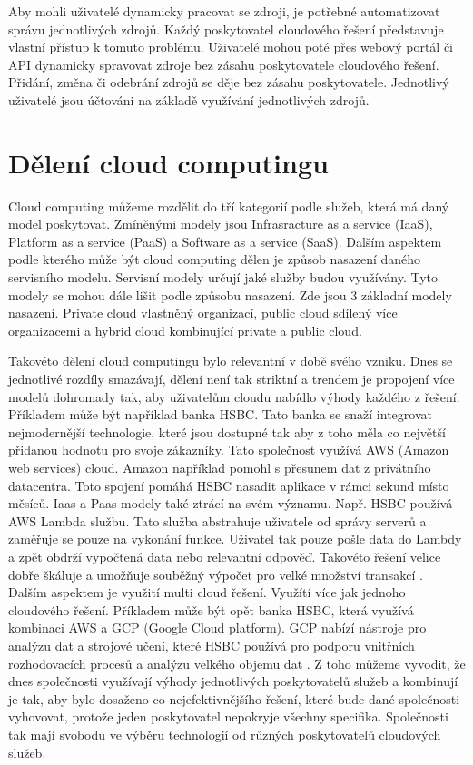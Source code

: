     Aby mohli uživatelé dynamicky pracovat se zdroji, je potřebné automatizovat správu jednotlivých zdrojů. Každý poskytovatel cloudového řešení představuje vlastní přístup k tomuto problému. Uživatelé mohou poté přes webový portál či API dynamicky spravovat zdroje bez zásahu poskytovatele cloudového řešení. Přidání, změna či odebrání zdrojů se děje bez zásahu poskytovatele. Jednotlivý uživatelé jsou účtováni na základě využívání jednotlivých zdrojů. 

\section{Dělení cloud computingu}
    Cloud computing můžeme rozdělit do tří kategorií podle služeb, která má daný model poskytovat. Zmíněnými modely jsou Infrasracture as a service (IaaS), Platform as a service (PaaS) a Software as a service (SaaS). Dalším aspektem podle kterého může být cloud computing dělen je způsob nasazení daného servisního modelu. Servisní modely určují jaké služby budou využívány. Tyto modely se mohou dále lišit podle způsobu nasazení. Zde jsou 3 základní modely nasazení. Private cloud vlastněný organizací, public cloud sdílený více organizacemi a hybrid cloud kombinující private a public cloud. \par
        Takovéto dělení cloud computingu bylo relevantní v době svého vzniku. Dnes se jednotlivé rozdíly smazávají, dělení není tak striktní a trendem je propojení více modelů dohromady tak, aby uživatelům cloudu nabídlo výhody každého z řešení. Příkladem může být například banka HSBC. Tato banka se snaží integrovat nejmodernější technologie, které jsou dostupné tak aby z toho měla co největší přidanou hodnotu \linebreak pro svoje zákazníky. Tato společnost využívá AWS (Amazon web services) cloud. Amazon například pomohl s přesunem dat z privátního datacentra. Toto spojení pomáhá HSBC nasadit aplikace v rámci sekund místo měsíců. Iaas a Paas modely také ztrácí na svém významu. Např. HSBC používá AWS Lambda službu. Tato služba abstrahuje uživatele od správy serverů a zaměřuje se pouze na vykonání funkce. Uživatel tak pouze pošle data do Lambdy a zpět obdrží vypočtená data nebo relevantní odpověď. Takovéto řešení velice dobře škáluje a umožňuje souběžný výpočet pro velké množství transakcí \cite{devopsonline}. Dalším aspektem je využití multi cloud řešení. Využítí více jak jednoho cloudového řešení. Příkladem může být opět banka HSBC, která využívá kombinaci AWS a GCP (Google Cloud platform). GCP nabízí nástroje pro analýzu dat a strojové učení, které HSBC používá pro podporu vnitřních rozhodovacích procesů a analýzu velkého objemu dat \cite{digitalnewasia}. Z toho můžeme vyvodit, že dnes společnosti využívají výhody jednotlivých poskytovatelů služeb a kombinují je tak, aby bylo dosaženo co nejefektivnějšího řešení, které bude dané společnosti vyhovovat, protože jeden poskytovatel nepokryje všechny specifika. Společnosti tak mají svobodu ve výběru technologií od různých poskytovatelů cloudových služeb.\par
